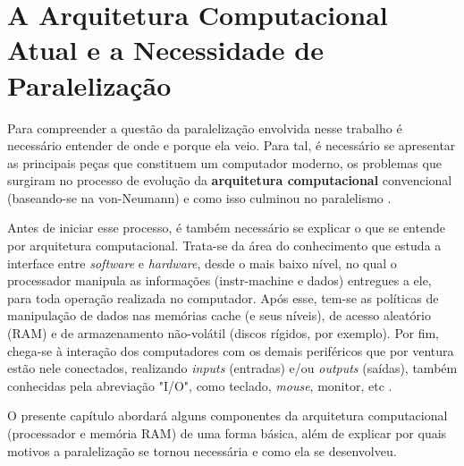 
\chapter{A Arquitetura Computacional Atual e a Necessidade de Paralelização}

Para compreender a questão da paralelização envolvida nesse trabalho é
necessário entender de onde e porque ela veio. Para tal, é necessário
se apresentar as principais peças que constituem um computador moderno,
os problemas que surgiram no processo de evolução da \textbf{arquitetura
computacional} convencional (baseando-se na \gls{von-Neumann}) e como isso culminou no 
paralelismo \cite{LLNL:parcomp}.

Antes de iniciar esse processo, é também necessário se explicar o que se
entende por arquitetura computacional. Trata-se da área do conhecimento
que estuda a interface entre \textit{software} e \textit{hardware}, desde
o mais baixo nível, no qual o processador manipula as informações
(\gls{instr-machine} e dados) entregues a ele, para toda operação realizada no
computador. Após esse, tem-se as políticas de manipulação de dados nas memórias
cache (e seus níveis), de acesso aleatório (\acrshort{RAM}) e de 
armazenamento não-volátil (discos rígidos, por exemplo).
Por fim, chega-se à interação dos computadores com os demais periféricos que
por ventura estão nele conectados, realizando \textit{inputs} (entradas)
e/ou \textit{outputs} (saídas), também conhecidas pela abreviação "I/O",
como teclado, \textit{mouse}, monitor, etc \cite{Catsoulis}.

O presente capítulo abordará alguns componentes da arquitetura computacional 
(processador e memória \acrshort{RAM}) de uma forma básica, além de explicar por quais 
motivos a paralelização se tornou necessária e como ela se desenvolveu.







